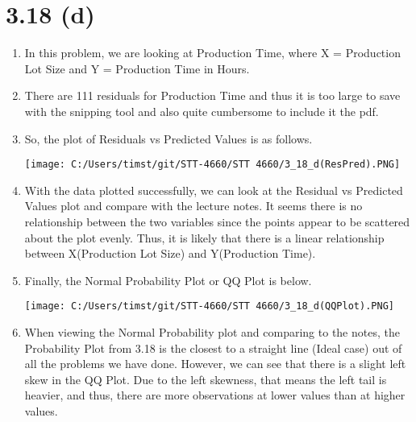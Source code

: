 \documentclass{article}
\begin{document}
\section*{3.18 (d)}
	\begin{enumerate}[label = \arabic*)]
		\item In this problem, we are looking at Production Time, where X = Production Lot Size and Y = Production Time in Hours.
		\item There are 111 residuals for Production Time and thus it is too large to save with the snipping tool and also quite cumbersome to include it the pdf.
		\item So, the plot of Residuals vs Predicted Values is as follows.
		
		\texttt{[image: C:/Users/timst/git/STT-4660/STT 4660/3\_18\_d(ResPred).PNG]}
		\item With the data plotted successfully, we can look at the Residual vs Predicted Values plot and compare with the lecture notes. It seems there is no relationship between the two variables since the points appear to be scattered about the plot evenly. Thus, it is likely that there is a linear relationship between X(Production Lot Size) and Y(Production Time).
		
		\item Finally, the Normal Probability Plot or QQ Plot is below.
		
		\texttt{[image: C:/Users/timst/git/STT-4660/STT 4660/3\_18\_d(QQPlot).PNG]}
		\item When viewing the Normal Probability plot and comparing to the notes, the Probability Plot from 3.18 is the closest to a straight line (Ideal case) out of all the problems we have done. However, we can see that there is a slight left skew in the QQ Plot. Due to the left skewness, that means the left tail is heavier, and thus, there are more observations at lower values than at higher values.
		
		
		
	\end{enumerate}
\end{document}
